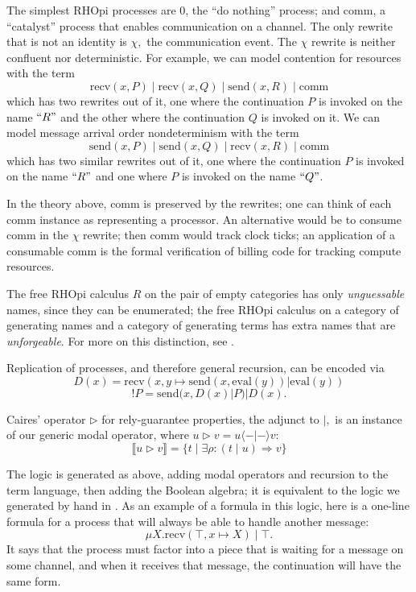 \documentclass{llncs}
\newcommand{\interp}[1]{\llbracket #1 \rrbracket}
\newcommand{\maps}{\colon}
\newcommand{\send}{\mathrm{send}}
\newcommand{\recv}{\mathrm{recv}}
\newcommand{\comm}{\mathrm{comm}}
\renewcommand{\quote}[1]{``#1"}
\newcommand{\deref}[1]{\mathrm{eval}(#1)}
\begin{document}
The simplest RHOpi processes are 0, the ``do nothing'' process; and comm, a ``catalyst'' process that enables communication on a channel.  The only rewrite that is not an identity is $\chi,$ the communication event.  The $\chi$ rewrite is neither confluent nor deterministic.  For example, we can model contention for resources with the term
\[ \recv(x, P)\;|\;\recv(x, Q)\;|\;\send(x,R)\;|\;\comm \]
which has two rewrites out of it, one where the continuation $P$ is invoked on the name $\quote{R}$ and the other where the continuation $Q$ is invoked on it.  We can model message arrival order nondeterminism with the term
\[ \send(x, P)\;|\;\send(x, Q)\;|\;\recv(x,R)\;|\;\comm \]
which has two similar rewrites out of it, one where the continuation $P$ is invoked on the name $\quote{R}$ and one where $P$ is invoked on the name $\quote{Q}$.

In the theory above, comm is preserved by the rewrites; one can think of each comm instance as representing a processor.  An alternative would be to consume comm in the $\chi$ rewrite; then comm would track clock ticks; an application of a consumable comm is the formal verification of billing code for tracking compute resources.

The free RHOpi calculus $R$ on the pair of empty categories has only {\em unguessable} names, since they can be enumerated; the free RHOpi calculus on a category of generating names and a category of generating terms has extra names that are {\em unforgeable}.  For more on this distinction, see \cite{MillerYeeShapiro}.

Replication of processes, and therefore general recursion, can be encoded \cite{DBLP:journals/entcs/MeredithR05} via
\[D(x) = \recv(x, y\mapsto \send(x, \deref{y}) | \deref{y})\]
\[!P = \send(x, D(x) | P) | D(x).\]

Caires' \cite{Caires} operator $\triangleright$ for rely-guarantee properties, the adjunct to $|,$ is an instance of our generic modal operator, where $u \triangleright v = u \langle - | - \rangle v:$
\[ \interp{u \triangleright v} = \{ t \;|\; \exists \rho\maps (t\;|\;u) \Rightarrow v\} \]

The logic is generated as above, adding modal operators and recursion to the term language, then adding the Boolean algebra; it is equivalent to the logic we generated by hand in \cite{DBLP:conf/tgc/MeredithR05}.  As an example of a formula in this logic, here is a one-line formula for a process that will always be able to handle another message:
\[ \mu X. \recv(\top, x \mapsto X)\;|\;\top. \]
It says that the process must factor into a piece that is waiting for a message on some channel, and when it receives that message, the continuation will have the same form.
\end{document}
